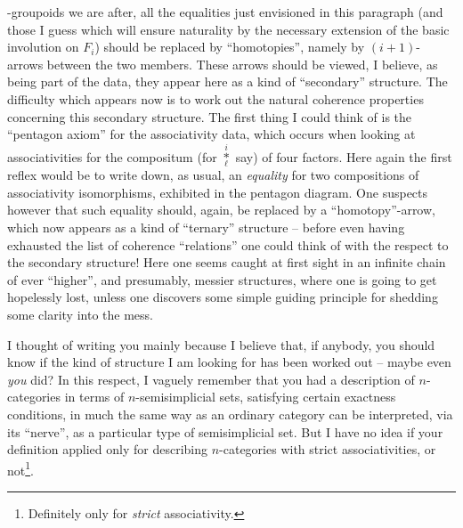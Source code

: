 \oo-groupoids we are after, all the equalities just envisioned in this
paragraph (and those I guess which will ensure naturality by the
necessary extension of the basic involution on $F_i$) should be
replaced by ``homotopies'', namely by $(i+1)$-arrows between the two
members. These arrows should be viewed, I believe, as being part of
the data, they appear here as a kind of ``secondary'' structure. The
difficulty which appears now is to work out the natural coherence
properties concerning this secondary structure. The first thing I
could think of is the ``pentagon axiom'' for the associativity data,
which occurs when looking at associativities for the compositum (for
$\overset{i}{\underset{\ell}{*}}$ say) of four factors. Here again the
first reflex would be to write down, as usual, an \emph{equality} for
two compositions of associativity isomorphisms, exhibited in the
pentagon diagram. One suspects however that such equality should,
again, be replaced by a ``homotopy''-arrow, which now appears as a
kind of ``ternary'' structure -- before even having exhausted the list
of coherence ``relations'' one could think of with the respect to the
secondary structure! Here one seems caught at first sight in an
infinite chain of ever ``higher'', and presumably, messier structures,
where one is going to get hopelessly lost, unless one discovers some
simple guiding principle for shedding some clarity into the mess.

\label{sec:3}%
I thought of writing you mainly because I believe that,
if anybody, you should know if the kind of structure I am looking for
has been worked out -- maybe even \emph{you} did? In this respect, I
vaguely remember that you had a description of $n$-categories in terms
of $n$-semisimplicial sets, satisfying certain exactness conditions,
in much the same way as an ordinary category can be interpreted, via
its ``nerve'', as a particular type of semisimplicial set. But I have
no idea if your definition applied only for describing $n$-categories
with strict associativities, or not\footnote{Definitely only for \emph{strict} associativity.}.


